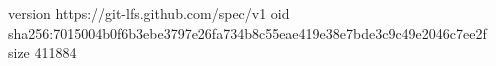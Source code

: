 version https://git-lfs.github.com/spec/v1
oid sha256:7015004b0f6b3ebe3797e26fa734b8c55eae419e38e7bde3c9c49e2046c7ee2f
size 411884
